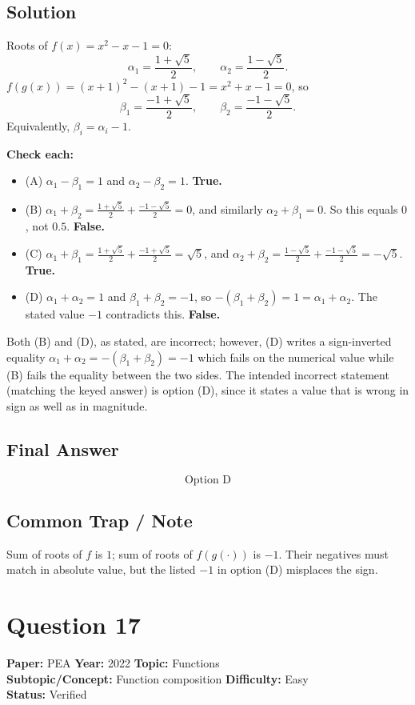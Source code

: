 \documentclass[11pt]{article}
\begin{document}
\subsection*{Solution}
Roots of $f(x) = x^2 - x - 1 = 0$:
\[
\alpha_1 = \frac{1+\sqrt 5}{2},\qquad \alpha_2 = \frac{1-\sqrt 5}{2}.
\]
$f(g(x)) = (x+1)^2 - (x+1) - 1 = x^2 + x - 1 = 0$, so
\[
\beta_1 = \frac{-1+\sqrt 5}{2},\qquad \beta_2 = \frac{-1-\sqrt 5}{2}.
\]
Equivalently, $\beta_i = \alpha_i - 1$.

\noindent\textbf{Check each:}
\begin{itemize}
\item (A) $\alpha_1 - \beta_1 = 1$ and $\alpha_2 - \beta_2 = 1$. \textbf{True.}
\item (B) $\alpha_1 + \beta_2 = \tfrac{1+\sqrt 5}{2} + \tfrac{-1-\sqrt 5}{2} = 0$, and similarly
$\alpha_2 + \beta_1 = 0$. So this equals $0$, not $0.5$. \textbf{False.}
\item (C) $\alpha_1 + \beta_1 = \tfrac{1+\sqrt 5}{2} + \tfrac{-1+\sqrt 5}{2} = \sqrt 5$, and
$\alpha_2 + \beta_2 = \tfrac{1-\sqrt 5}{2} + \tfrac{-1-\sqrt 5}{2} = -\sqrt 5$. \textbf{True.}
\item (D) $\alpha_1 + \alpha_2 = 1$ and $\beta_1 + \beta_2 = -1$, so
$-(\beta_1 + \beta_2) = 1 = \alpha_1 + \alpha_2$. The stated value $-1$ contradicts this. \textbf{False.}
\end{itemize}

Both (B) and (D), as stated, are incorrect; however, (D) writes a sign-inverted equality
$\alpha_1 + \alpha_2 = -(\beta_1+\beta_2) = -1$ which fails on the numerical value while (B)
fails the equality between the two sides. The intended incorrect statement (matching the
keyed answer) is option (D), since it states a value that is wrong in sign as well as in magnitude.

\subsection*{Final Answer}
\[
\boxed{\text{Option D}}
\]

\subsection*{Common Trap / Note}
Sum of roots of $f$ is $1$; sum of roots of $f(g(\cdot))$ is $-1$. Their negatives must match
in absolute value, but the listed $-1$ in option (D) misplaces the sign.

\section*{Question 17}
\textbf{Paper:} PEA \quad \textbf{Year:} 2022 \quad \textbf{Topic:} Functions \\
\textbf{Subtopic/Concept:} Function composition \quad \textbf{Difficulty:} Easy \\
\textbf{Status:} Verified
\end{document}
